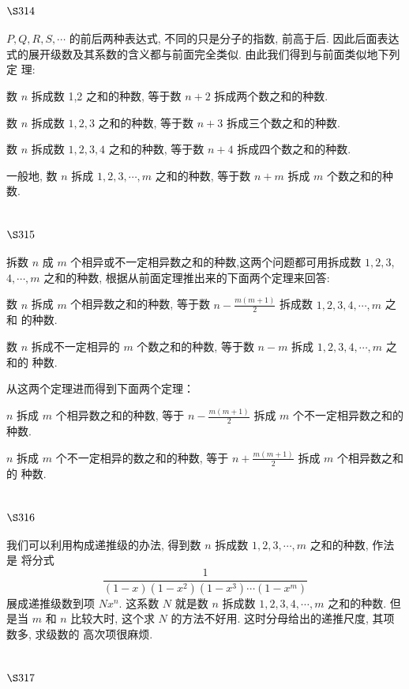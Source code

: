 \section{$\S 314$}

$P, Q, R, S, \cdots$ 的前后两种表达式, 不同的只是分子的指数, 前高于后. 因此后面表达 式的展开级数及其系数的含义都与前面完全类似. 由此我们得到与前面类似地下列定 理:

数 $n$ 拆成数 1,2 之和的种数, 等于数 $n+2$ 拆成两个数之和的种数.

数 $n$ 拆成数 $1,2,3$ 之和的种数, 等于数 $n+3$ 拆成三个数之和的种数.

数 $n$ 拆成数 $1,2,3,4$ 之和的种数, 等于数 $n+4$ 拆成四个数之和的种数.

一般地, 数 $n$ 拆成 $1,2,3, \cdots, m$ 之和的种数, 等于数 $n+m$ 拆成 $m$ 个数之和的种数.

\section{$\S 315$}

拆数 $n$ 成 $m$ 个相异或不一定相异数之和的种数,这两个问题都可用拆成数 $1,2,3$, $4, \cdots, m$ 之和的种数, 根据从前面定理推出来的下面两个定理来回答:

数 $n$ 拆成 $m$ 个相异数之和的种数, 等于数 $n-\frac{m(m+1)}{2}$ 拆成数 $1,2,3,4, \cdots, m$ 之和 的种数.

数 $n$ 拆成不一定相异的 $m$ 个数之和的种数, 等于数 $n-m$ 拆成 $1,2,3,4, \cdots, m$ 之和的 种数.

从这两个定理进而得到下面两个定理：

$n$ 拆成 $m$ 个相异数之和的种数, 等于 $n-\frac{m(m+1)}{2}$ 拆成 $m$ 个不一定相异数之和的种数.

$n$ 拆成 $m$ 个不一定相异的数之和的种数, 等于 $n+\frac{m(m+1)}{2}$ 拆成 $m$ 个相异数之和的 种数.

\section{$\S 316$}

我们可以利用构成递推级的办法, 得到数 $n$ 拆成数 $1,2,3, \cdots, m$ 之和的种数, 作法是 将分式
\[
\frac{1}{(1-x)\left(1-x^{2}\right)\left(1-x^{3}\right) \cdots\left(1-x^{m}\right)}
\]
展成递推级数到项 $N x^{n}$. 这系数 $N$ 就是数 $n$ 拆成数 $1,2,3,4, \cdots, m$ 之和的种数. 但是当 $m$ 和 $n$ 比较大时, 这个求 $N$ 的方法不好用. 这时分母给出的递推尺度, 其项数多, 求级数的 高次项很麻烦.

\section{$\S 317$}

